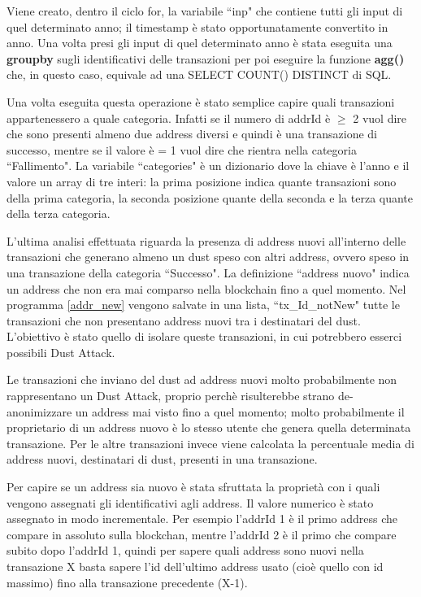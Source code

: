 Viene creato, dentro il ciclo for, la variabile ``inp" che contiene tutti gli input di quel determinato anno; il timestamp è stato opportunatamente convertito in anno. Una volta presi gli input di quel determinato anno è stata eseguita una \textbf{groupby} sugli identificativi delle transazioni per poi eseguire la funzione \textbf{agg({})} che, in questo caso, equivale ad una SELECT COUNT() DISTINCT di SQL.

Una volta eseguita questa operazione è stato semplice capire quali transazioni appartenessero a quale categoria. Infatti se il numero di addrId è $\ge$ 2 vuol dire che sono presenti almeno due address diversi e quindi è una transazione di successo, mentre se il valore è = 1 vuol dire che rientra nella categoria ``Fallimento". 
La variabile ``categories" è un dizionario dove la chiave è l'anno e il valore un array di tre interi: la prima posizione indica quante transazioni sono della prima categoria, la seconda posizione quante della seconda e la terza quante della terza categoria. 


L'ultima analisi effettuata riguarda la presenza di address nuovi all'interno delle transazioni che generano almeno un dust speso con altri address, ovvero speso in una transazione della categoria ``Successo". La definizione ``address nuovo" indica un address che non era mai comparso nella blockchain fino a quel momento. 
Nel programma \ref{addr_new} vengono salvate in una lista, ``tx\_Id\_notNew" tutte le transazioni che non presentano address nuovi tra i destinatari del dust. L'obiettivo è stato quello di isolare queste transazioni, in cui potrebbero esserci possibili Dust Attack.

Le transazioni che inviano del dust ad address nuovi  molto probabilmente non rappresentano un Dust Attack, proprio perchè risulterebbe strano de-anonimizzare un address mai visto fino a quel momento; molto probabilmente il proprietario di un address nuovo è lo stesso utente che genera quella determinata transazione. Per le altre transazioni invece viene calcolata la percentuale media di address nuovi, destinatari di dust, presenti in una transazione. 

Per capire se un address sia nuovo è stata sfruttata la proprietà con i quali vengono assegnati gli identificativi agli address. Il valore numerico è stato assegnato in modo incrementale. Per esempio l’addrId 1 è il primo address che compare in assoluto sulla blockchan, mentre l’addrId 2 è il primo che compare subito dopo l’addrId 1, quindi per sapere quali address sono nuovi nella transazione X basta sapere l'id dell'ultimo address usato (cioè quello con id massimo) fino alla transazione precedente (X-1). 

